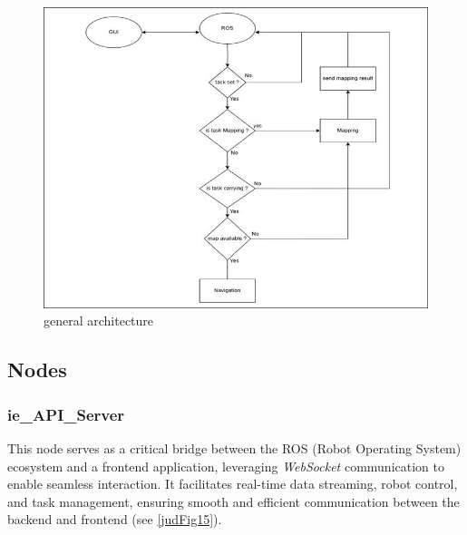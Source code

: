 \documentclass[a4paper,12pt]{extreport}
\begin{document}
\begin{figure}[h!]
\centering
\includegraphics[width=\textwidth]{img/image024.jpg}
\caption{general architecture}
\end{figure}

\subsection{Nodes}

\subsubsection{ie\_API\_Server}

This node serves as a critical bridge between the ROS (Robot Operating
System) ecosystem and a frontend application, leveraging
\emph{WebSocket} communication to enable seamless interaction. It
facilitates real-time data streaming, robot control, and task
management, ensuring smooth and efficient communication between the
backend and frontend (see \cref{judFig15}).
\end{document}
